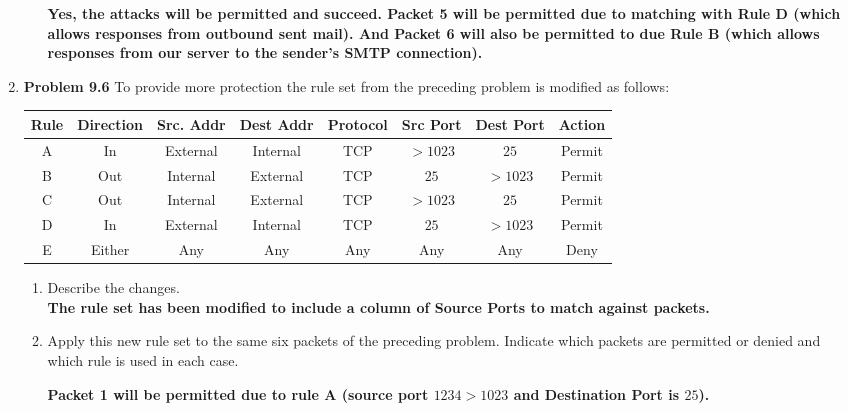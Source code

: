\documentclass[12pt]{article}
\begin{document}
\begin{enumerate}
\begin{enumerate}
  \textbf{Yes, the attacks will be permitted and succeed. Packet 5 will be permitted due to matching with Rule D (which allows responses from outbound sent mail). And Packet 6 will also be permitted to due Rule B (which allows responses from our server to the sender's SMTP connection).} \\

\end{enumerate}


  \item \textbf{Problem 9.6} To provide more protection the rule set from the preceding problem is modified as follows:  \\

  \begin{center}
   \begin{tabular}{||c c c c c c c c||}
   \hline
   Rule & Direction & Src. Addr & Dest Addr  & Protocol & Src Port &  Dest Port & Action \\ [0.5ex]
   \hline\hline
   A & In & External & Internal & TCP & $>1023$ & $25$ & Permit \\
   \hline
   B & Out & Internal & External & TCP & $25$ & $>1023$ & Permit \\
   \hline
   C & Out & Internal & External & TCP & $>1023$ & $25$ & Permit \\
   \hline
   D & In & External & Internal & TCP & $25$ & $>1023$ & Permit \\
   \hline
   E & Either & Any & Any & Any & Any & Any & Deny \\ [1ex]
   \hline
  \end{tabular}
  \end{center}

  \begin{enumerate}
    \item Describe the changes. \\

    \textbf{The rule set has been modified to include a column of Source Ports to match against packets.} \\

    \item Apply this new rule set to the same six packets of the preceding problem. Indicate which packets are permitted or denied and which rule is used in each case.

    \textbf{Packet 1 will be permitted due to rule A (source port $1234 > 1023$ and  Destination Port is $25$).} \\


\end{enumerate}
\end{enumerate}
\end{document}
